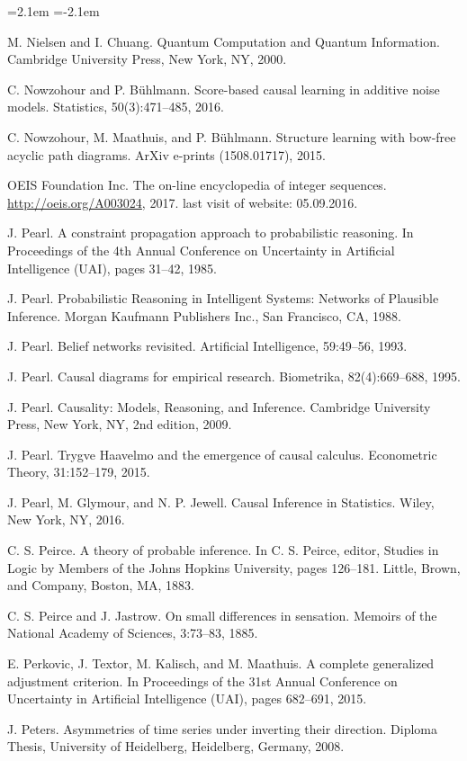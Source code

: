 \begin{list}{}{\leftmargin=2.1em
 \itemindent=-2.1em\parsep=0pt\itemsep=3pt}
\item M. Nielsen and I. Chuang. Quantum Computation and Quantum Information. Cambridge University Press, New York, NY, 2000.
\item C. Nowzohour and P. Bühlmann. Score-based causal learning in additive noise models. Statistics, 50(3):471--485, 2016.
\item C. Nowzohour, M. Maathuis, and P. Bühlmann. Structure learning with bow-free acyclic path diagrams. ArXiv e-prints (1508.01717), 2015.
\item OEIS Foundation Inc. The on-line encyclopedia of integer sequences. \url{http://oeis.org/A003024}, 2017. last visit of website: 05.09.2016.
\item J. Pearl. A constraint propagation approach to probabilistic reasoning. In Proceedings of the 4th Annual Conference on Uncertainty in Artificial Intelligence (UAI), pages 31--42, 1985.
\item J. Pearl. Probabilistic Reasoning in Intelligent Systems: Networks of Plausible Inference. Morgan Kaufmann Publishers Inc., San Francisco, CA, 1988.
\item J. Pearl. Belief networks revisited. Artificial Intelligence, 59:49--56, 1993.
\item J. Pearl. Causal diagrams for empirical research. Biometrika, 82(4):669--688, 1995.
\item J. Pearl. Causality: Models, Reasoning, and Inference. Cambridge University Press, New York, NY, 2nd edition, 2009.
\item J. Pearl. Trygve Haavelmo and the emergence of causal calculus. Econometric Theory, 31:152--179, 2015.
\item J. Pearl, M. Glymour, and N. P. Jewell. Causal Inference in Statistics. Wiley, New York, NY, 2016.
\item C. S. Peirce. A theory of probable inference. In C. S. Peirce, editor, Studies in Logic by Members of the Johns Hopkins University, pages 126--181. Little, Brown, and Company, Boston, MA, 1883.
\item C. S. Peirce and J. Jastrow. On small differences in sensation. Memoirs of the National Academy of Sciences, 3:73--83, 1885.
\item E. Perkovic, J. Textor, M. Kalisch, and M. Maathuis. A complete generalized adjustment criterion. In Proceedings of the 31st Annual Conference on Uncertainty in Artificial Intelligence (UAI), pages 682--691, 2015.
\item J. Peters. Asymmetries of time series under inverting their direction. Diploma Thesis, University of Heidelberg, Heidelberg, Germany, 2008.

\end{list}
